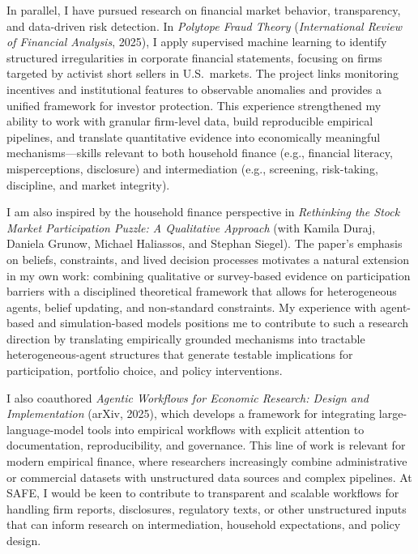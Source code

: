 \documentclass[11pt]{article}
\begin{document}
In parallel, I have pursued research on financial market behavior, transparency, and data-driven risk detection. 
In \textit{Polytope Fraud Theory} (\textit{International Review of Financial Analysis}, 2025), I apply supervised machine learning to identify structured irregularities in corporate financial statements, focusing on firms targeted by activist short sellers in U.S.\ markets. 
The project links monitoring incentives and institutional features to observable anomalies and provides a unified framework for investor protection. 
This experience strengthened my ability to work with granular firm-level data, build reproducible empirical pipelines, and translate quantitative evidence into economically meaningful mechanisms---skills relevant to both household finance (e.g., financial literacy, misperceptions, disclosure) and intermediation (e.g., screening, risk-taking, discipline, and market integrity).

I am also inspired by the household finance perspective in \textit{Rethinking the Stock Market Participation Puzzle: A Qualitative Approach} (with Kamila Duraj, Daniela Grunow, Michael Haliassos, and Stephan Siegel). 
The paper's emphasis on beliefs, constraints, and lived decision processes motivates a natural extension in my own work: combining qualitative or survey-based evidence on participation barriers with a disciplined theoretical framework that allows for heterogeneous agents, belief updating, and non-standard constraints. 
My experience with agent-based and simulation-based models positions me to contribute to such a research direction by translating empirically grounded mechanisms into tractable heterogeneous-agent structures that generate testable implications for participation, portfolio choice, and policy interventions.

I also coauthored \textit{Agentic Workflows for Economic Research: Design and Implementation} (arXiv, 2025), which develops a framework for integrating large-language-model tools into empirical workflows with explicit attention to documentation, reproducibility, and governance. 
This line of work is relevant for modern empirical finance, where researchers increasingly combine administrative or commercial datasets with unstructured data sources and complex pipelines. 
At SAFE, I would be keen to contribute to transparent and scalable workflows for handling firm reports, disclosures, regulatory texts, or other unstructured inputs that can inform research on intermediation, household expectations, and policy design.
\end{document}
